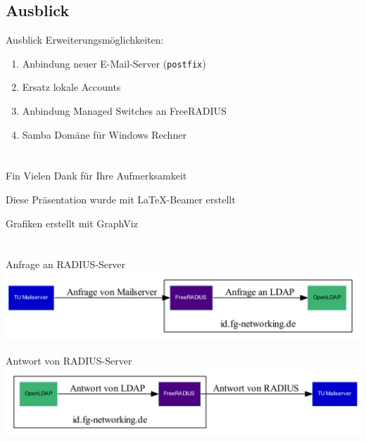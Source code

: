 \documentclass[presentation,svgnames,12pt]{beamer}
\begin{document}
\subsection{Ausblick}
\begin{frame}{Ausblick}
Erweiterungsmöglichkeiten:
\vspace{6pt}
	\begin{enumerate}
		\item Anbindung neuer E-Mail-Server (\texttt{postfix})
		\item Ersatz lokale Accounts
		\item Anbindung Managed Switches an FreeRADIUS
		\item Samba Domäne für Windows Rechner
	\end{enumerate}
\end{frame}


\section{} %
\begin{frame}{Fin}
	Vielen Dank für Ihre Aufmerksamkeit
	
	\medskip
	\medskip Diese Präsentation wurde mit \LaTeX{}-Beamer erstellt
	
	Grafiken erstellt mit GraphViz
\end{frame}


\section{}
\setcounter{framenumber}{14}
\begin{frame}{Anfrage an RADIUS-Server}
\centering
\includegraphics[width=\textwidth]{Bilder/RADIUS-communication1.pdf}
\end{frame}


\setcounter{framenumber}{14}
\begin{frame}{Antwort von RADIUS-Server}
\centering
\includegraphics[width=\textwidth]{Bilder/RADIUS-communication2.pdf}
\end{frame}
\end{document}
